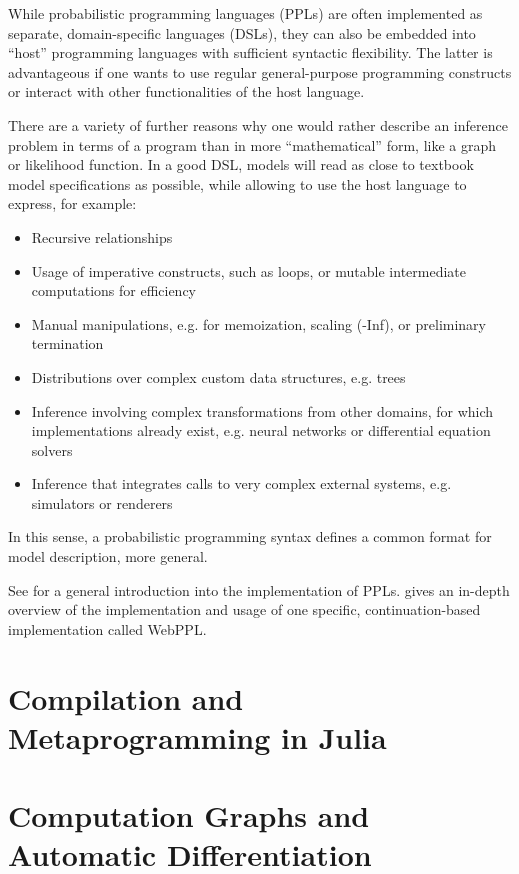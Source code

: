 While probabilistic programming languages (PPLs) are often implemented as separate, domain-specific
languages (DSLs), they can also be embedded into \enquote{host} programming languages with
sufficient syntactic flexibility.  The latter is advantageous if one wants to use regular
general-purpose programming constructs or interact with other functionalities of the host language.

There are a variety of further reasons why one would rather describe an inference problem in terms
of a program than in more \enquote{mathematical} form, like a graph or likelihood function.  In a
good DSL, models will read as close to textbook model specifications as possible, while allowing to
use the host language to express, for example:
\begin{itemize}
  \firmlist
\item Recursive relationships
\item Usage of imperative constructs, such as loops, or mutable intermediate computations for
  efficiency
\item Manual manipulations, e.g. for memoization, scaling (-Inf), or preliminary termination
\item Distributions over complex custom data structures, e.g. trees
\item Inference involving complex transformations from other domains, for which implementations
  already exist, e.g. neural networks or differential equation solvers
\item Inference that integrates calls to very complex external systems, e.g. simulators or renderers
\end{itemize}

In this sense, a probabilistic programming syntax defines a common format for model description,
more general.

See \textcite{vandemeent2018introduction} for a general introduction into the implementation of
PPLs. \Textcite{goodman2014design} gives an in-depth overview of the implementation and usage of one
specific, continuation-based implementation called WebPPL.

\section{Compilation and Metaprogramming in Julia}
\label{sec:comp-metapr-julia}

\textcite{singer2018introduction}


\section{Computation Graphs and Automatic Differentiation}
\label{sec:graph-track-autom}





